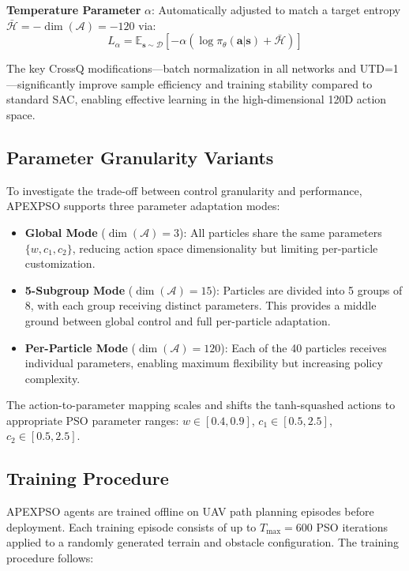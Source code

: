 \documentclass[fleqn,10pt]{wlscirep}
\begin{document}
\textbf{Temperature Parameter} $\alpha$: Automatically adjusted to match a target entropy $\bar{\mathcal{H}} = -\dim(\mathcal{A}) = -120$ via:
\begin{equation}
L_\alpha = \mathbb{E}_{\mathbf{s} \sim \mathcal{D}}\left[-\alpha \left(\log \pi_\theta(\mathbf{a}|\mathbf{s}) + \bar{\mathcal{H}}\right)\right]
\end{equation}

The key CrossQ modifications---batch normalization in all networks and UTD=1---significantly improve sample efficiency and training stability compared to standard SAC, enabling effective learning in the high-dimensional 120D action space.

\subsection*{Parameter Granularity Variants}

To investigate the trade-off between control granularity and performance, APEXPSO supports three parameter adaptation modes:

\begin{itemize}
\item \textbf{Global Mode} ($\dim(\mathcal{A}) = 3$): All particles share the same parameters $\{w, c_1, c_2\}$, reducing action space dimensionality but limiting per-particle customization.
\item \textbf{5-Subgroup Mode} ($\dim(\mathcal{A}) = 15$): Particles are divided into 5 groups of 8, with each group receiving distinct parameters. This provides a middle ground between global control and full per-particle adaptation.
\item \textbf{Per-Particle Mode} ($\dim(\mathcal{A}) = 120$): Each of the 40 particles receives individual parameters, enabling maximum flexibility but increasing policy complexity.
\end{itemize}

The action-to-parameter mapping scales and shifts the tanh-squashed actions to appropriate PSO parameter ranges: $w \in [0.4, 0.9]$, $c_1 \in [0.5, 2.5]$, $c_2 \in [0.5, 2.5]$.

\subsection*{Training Procedure}

APEXPSO agents are trained offline on UAV path planning episodes before deployment. Each training episode consists of up to $T_{\max} = 600$ PSO iterations applied to a randomly generated terrain and obstacle configuration. The training procedure follows:
\end{document}
